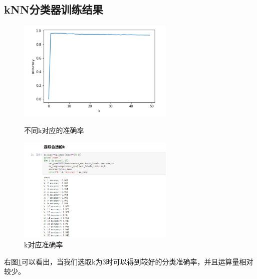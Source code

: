 \subsection{kNN分类器训练结果}
\begin{figure}[htbp]
  \centering
  \begin{minipage}[t]{0.48\textwidth}
    \centering
    \includegraphics[width=7.5cm]{figure/KNN/kfig.png}
    \caption{不同k对应的准确率}
    \label{fig:ch1KFig}
  \end{minipage}
  \begin{minipage}[t]{0.48\textwidth}
    \centering
    \includegraphics[width=7.5cm]{figure/KNN/kret.png}
    \caption{k对应准确率}
    \label{fig:ch1KRet}
  \end{minipage}
\end{figure}
右图\ref{fig:ch1KRet}可以看出，当我们选取k为3时可以得到较好的分类准确率，并且运算量相对较少。

